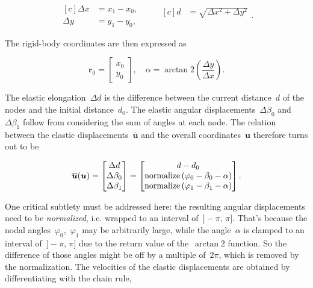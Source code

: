 \begin{equation}
\begin{aligned}[c]
\Delta x &= x_1 - x_0, \\
\Delta y& = y_1 - y_0,
\end{aligned}
\qquad
\begin{aligned}[c]
d &= \sqrt{\Delta x^2 + \Delta y^2} \\ \\
\end{aligned}.
\end{equation}

The rigid-body coordinates are then expressed as

\begin{equation}
\boldsymbol{r}_{0} = \begin{bmatrix}
x_0 \\
y_0
\end{bmatrix},
\quad
\alpha = \arctan2\left(\frac{\Delta y}{\Delta x}\right).
\end{equation}

The elastic elongation~$\Delta d$ is the difference between the current distance~$d$ of the nodes and the initial distance~$d_0$.
The elastic angular displacements~$\Delta \beta_0$ and~$\Delta \beta_1$ follow from considering the sum of angles at each node.
The relation between the elastic displacements~$\overline{\boldsymbol{u}}$ and the overall coordinates~$\boldsymbol{u}$ therefore turns out to be

\begin{equation}
\overline{\boldsymbol{u}}(\boldsymbol{u}) = \begin{bmatrix}
\Delta d \\ \Delta \beta_0 \\ \Delta \beta_1
\end{bmatrix}
=
\begin{bmatrix}
d - d_0 \\
\rm{normalize}\left(\varphi_0 - \beta_0 - \alpha\right) \\
\rm{normalize}\left(\varphi_1 - \beta_1 - \alpha\right)
\end{bmatrix}.
\end{equation}

One critical subtlety must be addressed here: the resulting angular displacements need to be \textit{normalized}, i.e. wrapped to an interval of~$]-\pi,\,\pi]$.
That's because the nodal angles~$\varphi_0$,~$\varphi_1$ may be arbitrarily large, while the angle~$\alpha$ is clamped to an interval of~$]-\pi,\,\pi]$ due to the return value of the~$\arctan2$ function.
So the difference of those angles might be off by a multiple of~$2\pi$, which is removed by the normalization.
The velocities of the elastic displacements are obtained by differentiating with the chain rule,

